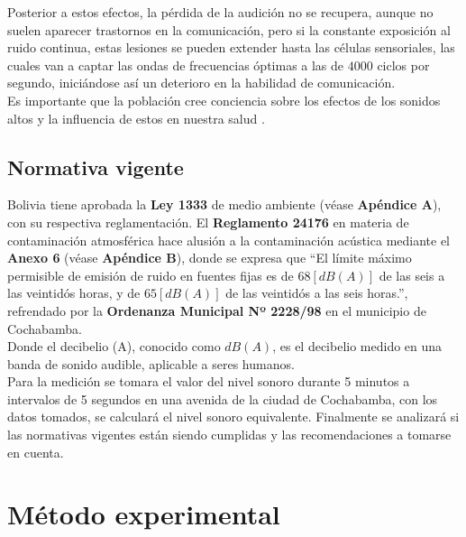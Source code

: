 \documentclass[letter,11pt]{article}
\begin{document}
Posterior a estos efectos, la pérdida de la audición no se recupera, aunque no
suelen aparecer trastornos en la comunicación, pero si la constante exposición
al ruido continua, estas lesiones se pueden extender hasta las células
sensoriales, las cuales van a captar las ondas de frecuencias óptimas a las de
$4000$ ciclos por segundo, iniciándose así un deterioro en la habilidad de
comunicación.
\\

Es importante que la población cree conciencia sobre los efectos de los sonidos
altos y la influencia de estos en nuestra salud \cite{ELSEVIER}.

\subsection{Normativa vigente}

Bolivia tiene aprobada la \textbf{Ley 1333} de medio ambiente (véase
\textbf{Apéndice A}), con su respectiva reglamentación. El
\textbf{Reglamento 24176} en materia de contaminación atmosférica hace alusión
a la contaminación acústica mediante el \textbf{Anexo 6} (véase
\textbf{Apéndice B}), donde se expresa que ``El límite máximo permisible de
emisión de ruido en fuentes fijas es de $68 [dB(A)]$ de las seis a las veintidós
horas, y de $65 [dB(A)]$ de las veintidós a las seis horas.'', refrendado por
la \textbf{Ordenanza Municipal Nº 2228/98} en el municipio de Cochabamba.
\\

Donde el decibelio (A), conocido como $dB(A)$, es el decibelio medido en una
banda de sonido audible, aplicable a seres humanos.
\\

Para la medición se tomara el valor del nivel sonoro durante 5 minutos a
intervalos de 5 segundos en una avenida de la ciudad de Cochabamba, con los
datos tomados, se calculará el nivel sonoro equivalente. Finalmente se
analizará si las normativas vigentes están siendo cumplidas y las
recomendaciones a tomarse en cuenta.

\section{Método experimental}
\end{document}
